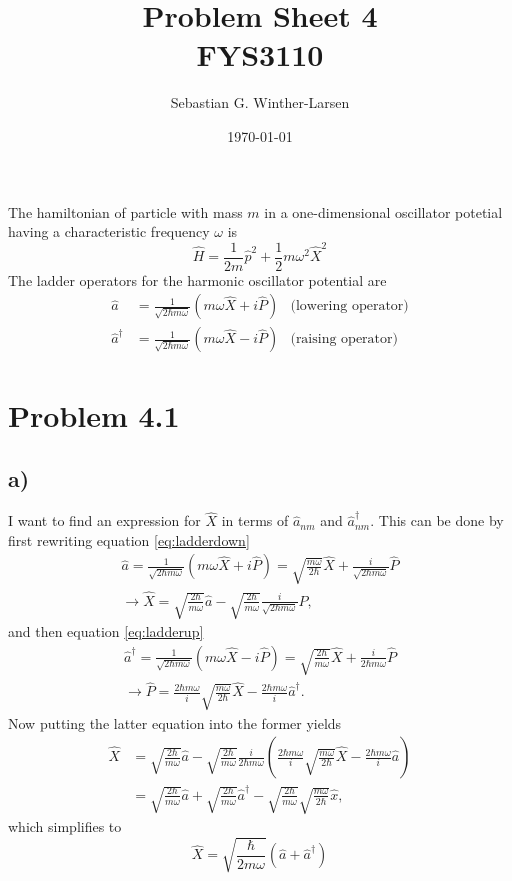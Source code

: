 \documentclass{article}
\title{Problem Sheet 4 \\
\large{FYS3110}}
\author{Sebastian G. Winther-Larsen}
\date{\today}
\begin{document}
\maketitle

The hamiltonian of particle with mass $m$ in a one-dimensional oscillator potetial having a characteristic frequency $\omega$ is
\begin{equation}
\hat{H}=\frac{1}{2m}\hat{p}^2+\frac{1}{2}m\omega^2\hat{X}^2
\end{equation}
The ladder operators for the harmonic oscillator potential are
\begin{align}
\hat{a}&=\frac{1}{\sqrt{2\hbar m\omega}}(m\omega\hat{X}+i\hat{P})
&\text{(lowering operator)} \label{eq:ladderdown} \\
\hat{a}^{\dagger}&=\frac{1}{\sqrt{2\hbar m\omega}}(m\omega\hat{X}-i\hat{P})
&\text{(raising operator)} \label{eq:ladderup}
\end{align}

\section*{Problem 4.1}

\subsection*{a)}

I want to find an expression for $\hat{X}$ in terms of $\hat{a}_{nm}$ and $\hat{a}^{\dagger}_{nm}$. This can be done by first rewriting equation \ref{eq:ladderdown}
\begin{align*}
\hat{a}=\frac{1}{\sqrt{2\hbar m\omega}}(m\omega\hat{X}+i\hat{P})
= \sqrt{\frac{m\omega}{2\hbar}}\hat{X}+\frac{i}{\sqrt{2\hbar m \omega}}\hat{P} \\
\rightarrow \hat{X} = \sqrt{\frac{2\hbar}{m\omega}}\hat{a}-\sqrt{\frac{2\hbar}{m\omega}}\frac{i}{\sqrt{2\hbar m\omega}}\hat{P}, 
\end{align*}
and then equation \ref{eq:ladderup}
\begin{align*}
\hat{a}^{\dagger} = \frac{1}{\sqrt{2\hbar m\omega}}(m\omega\hat{X}-i\hat{P}) = \sqrt{\frac{2\hbar}{m\omega}}\hat{X}+\frac{i}{2\hbar m\omega}\hat{P} \\
\rightarrow \hat{P}= \frac{2\hbar m \omega}{i}\sqrt{\frac{m\omega}{2\hbar}}\hat{X}-\frac{2\hbar m\omega}{i}\hat{a}^{\dagger}.
\end{align*}
Now putting the latter equation into the former yields
\begin{align*}
\hat{X}&=\sqrt{\frac{2\hbar}{m\omega}}\hat{a}-\sqrt{\frac{2\hbar}{m\omega}}\frac{i}{2\hbar m\omega}\left(\frac{2\hbar m\omega}{i}\sqrt{\frac{m\omega}{2\hbar}}\hat{X}-\frac{2\hbar m\omega}{i}\hat{a} \right) \\
&=\sqrt{\frac{2\hbar}{m\omega}}\hat{a}+\sqrt{\frac{2\hbar}{m\omega}}\hat{a}^{\dagger}-\sqrt{\frac{2\hbar}{m\omega}}\sqrt{\frac{m\omega}{2\hbar}}\hat{x},
\end{align*}
which simplifies to
\begin{equation}
\label{eq:xoperator}
\hat{X}=\sqrt{\frac{\hbar}{2m\omega}}(\hat{a}+\hat{a}^{\dagger})
\end{equation}
\end{document}
